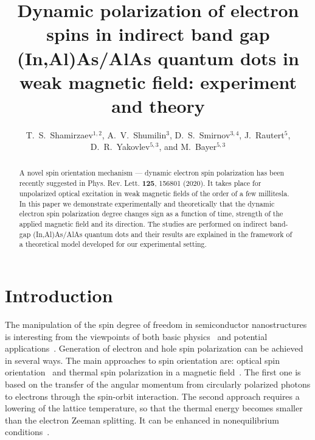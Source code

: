\documentclass[twocolumn,showpacs,preprintnumbers,amsmath,amssymb,aps]{revtex4-1}
\begin{document}
\title{Dynamic polarization of electron spins in indirect band gap (In,Al)As/AlAs quantum dots in weak magnetic field: experiment and theory}


\author{T.~S.~Shamirzaev$^{1,2}$, A.~V.~Shumilin$^{3}$, D.~S.~Smirnov$^{3,4}$, J.~Rautert$^5$, D.~R.~Yakovlev$^{5,3}$, and M.~Bayer$^{5,3}$}


\begin{abstract}
A novel spin orientation mechanism --- dynamic electron spin
polarization has been recently suggested in Phys. Rev. Lett.
\textbf{125}, 156801 (2020). It takes place for unpolarized optical
excitation in weak magnetic fields of the order of a few millitesla.
In this paper we demonstrate experimentally and theoretically that
the dynamic electron spin polarization degree changes sign as a
function of time, strength of the applied magnetic field and its
direction. The studies are performed on indirect band-gap
(In,Al)As/AlAs quantum dots and their results are explained in the
framework of a theoretical model developed for our experimental
setting.
\end{abstract}

\maketitle

\section{Introduction}
\label{sec:intro}

The manipulation of the spin degree of freedom in semiconductor
nanostructures is interesting  from the viewpoints of both basic
physics~\cite{Dyakonov,Glazov} and  potential
applications~\cite{Dyakonov1,Fert}. Generation of electron and hole
spin polarization can be achieved in several ways. The main
approaches to spin orientation are: optical spin
orientation~\cite{OO_book} and thermal spin polarization in a
magnetic
field~\cite{zeeman1897effect,Shamirzaev60,Shamirzaev96,Shamirzaev94}.
The first one is based on the transfer of the angular momentum from
circularly polarized photons to electrons through the spin-orbit
interaction. The second approach requires a lowering of the lattice
temperature, so that the thermal energy becomes smaller than the
electron Zeeman splitting. It can be enhanced in nonequilibrium
conditions~\cite{Ivchenko60}.
\end{document}
